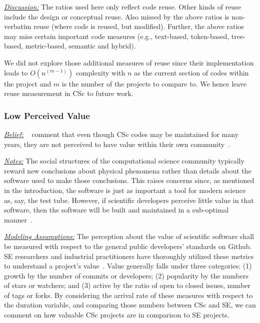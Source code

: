 \documentclass[conference,10pt]{IEEEtran}
\begin{document}
\noindent \textit{\underline{Discussion:}} 
The ratios used here only reflect code reuse.
Other kinds of reuse include the design or conceptual reuse. 
Also missed by the above ratios is non-verbatim reuse (where code is reused, but modified).
Further, the above ratios may miss certain important code measures
(e.g., text-based, token-based, tree-based, metric-based, semantic and hybrid).

We did not explore those additional measures of reuse since
their implementation leads to $O(n^{(m-1)})$ complexity with $n$ as the current section of codes within the project and $m$ is the number of the projects to compare to. We hence leave reuse measurement in CSc to  future work. \\




\subsubsection{Low Perceived Value}\label{tion:value} 

\noindent \textit{\underline{Belief:}} 
~\citet{easterbrook_cs} comment that even though CSc codes
may be maintained for many years,
they are not perceived to have value within their own community~\cite{faulk09_secs, boyle09_lessons}.

\noindent \textit{\underline{Notes:}} The social structures of the computational science community
typically reward new conclusions about physical phenomena rather than
details about the software used
to make those conclusions. This raises concerns since, as mentioned in the introduction, the software is just as important a tool for modern science as, say, the test tube. However, if scientific developers perceive little value in that software, then the software will be built and maintained in a sub-optimal manner~\cite{sanders08_risk}. 

\noindent \textit{\underline{Modeling Assumptions:}} 
The perception about the value of scientific software shall be measured with respect to the general public developers' standards on Github. SE researchers and industrial practitioners have thoroughly utilized these metrics to understand a project's value~\cite{grow_16, oss_success_linux, Borges_github, borges_github_star, Munaiah_curating, qualitygithub_14}. 
Value generally falls under three categories: (1) growth by the number of commits or developers; (2) popularity by the numbers of stars or watchers; and
(3) active by the ratio of open to closed issues, number of tags or forks. By considering the arrival rate of these measures with respect to the duration variable, and comparing those numbers between CSc and SE, we can comment on how valuable CSc projects are in comparison to SE projects.
\end{document}
